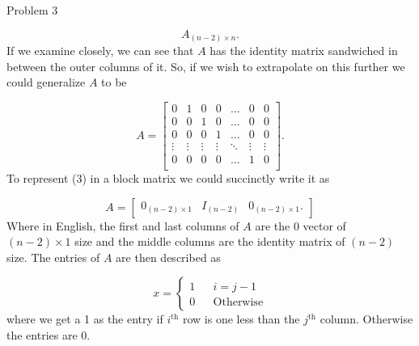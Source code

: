 \begin{problem}{Problem 3}
\begin{highlight}[Solution]
        \begin{equation}
            A_{(n - 2) \times n}.
        \end{equation}
        If we examine closely, we can see that $A$ has the identity matrix sandwiched in between the outer columns of it. So, if we wish to extrapolate on this further we could generalize $A$ to be

        \begin{equation}
            A = 
            \begin{bmatrix}
                0 & 1 & 0 & 0 & \dots & 0 & 0 \\
                0 & 0 & 1 & 0 & \dots & 0 & 0 \\
                0 & 0 & 0 & 1 & \dots & 0 & 0 \\
                \vdots & \vdots & \vdots & \vdots & \ddots & \vdots & \vdots \\
                0 & 0 & 0 & 0 & \dots & 1 & 0 \\
            \end{bmatrix}.
        \end{equation}
        To represent (3) in a block matrix we could succinctly write it as 

        \begin{equation}
            A =
            \begin{bmatrix}
                0_{(n-2)\times 1} & I_{(n-2)} & 0_{(n - 2) \times 1}.
            \end{bmatrix}
        \end{equation}
        Where in English, the first and last columns of $A$ are the 0 vector of $(n - 2) \times 1$ size and the middle columns are the identity matrix of $(n - 2)$ size. The entries of $A$ are then
        described as 

        \begin{equation}
            x = \left\{
                \begin{aligned}
                    1 & & i = j - 1 \\
                    0 & & \text{Otherwise} 
                \end{aligned}
            \right.
        \end{equation}
        where we get a 1 as the entry if $i^{\text{th}}$ row is one less than the $j^{\text{th}}$ column. Otherwise the entries are 0.
    \end{highlight}
\end{problem}

